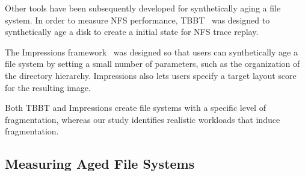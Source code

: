 

Other tools have been subsequently developed for
synthetically aging a file system.
In order to measure NFS performance,
TBBT~\cite{DBLP:conf/fast/ZhuCC05} was designed 
to synthetically age a disk 
to create a initial state for NFS trace replay.

The Impressions framework~\cite{DBLP:journals/tos/AgrawalAA09} was designed so that
users can synthetically age a 
file system by setting a small number of parameters,
such as the organization of the directory hierarchy.
Impressions also lets users specify a target layout score for the resulting image.

Both TBBT and Impressions
create file systems with a specific level of fragmentation,
whereas our study identifies realistic
workloads that induce fragmentation. 

\subsection{Measuring Aged File Systems}


